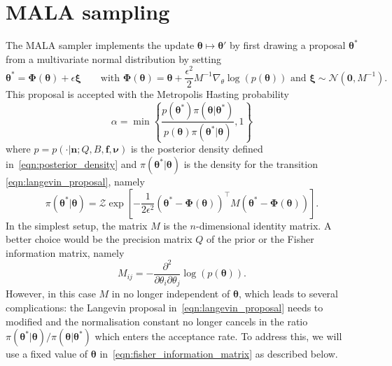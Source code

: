 \documentclass[11pt]{article}
\renewcommand{\vec}[1]{\boldsymbol{#1}}
\begin{document}
\section{MALA sampling}
The MALA sampler \cite{roberts1996exponential} implements the update $\vec{\theta}\mapsto\vec{\theta}'$ by first drawing a proposal $\vec{\theta}^*$ from a multivariate normal distribution by setting
\begin{equation}
\vec{\theta}^*=\vec{\Phi}(\vec{\theta})+\epsilon \vec{\xi} \qquad\text{with $\vec{\Phi}(\vec{\theta})=\vec{\theta}+\frac{\epsilon^2}{2}M^{-1}\nabla_\theta \log(p(\vec{\theta}))$ and $\vec{\xi}\sim \mathcal{N}(\vec{0},M^{-1})$}.
\label{eqn:langevin_proposal}
\end{equation}
This proposal is accepted with the Metropolis Hasting \cite{metropolis1953equation,hastings1970monte} probability
\begin{equation}
\alpha = \min\left\{\frac{p(\vec{\theta}^*)\pi(\vec{\theta}|\vec{\theta}^*)}{p(\vec{\theta})\pi(\vec{\theta}^*|\vec{\theta})},1\right\}
\end{equation}
where $p = p(\cdot|\vec{n};Q,B,\vec{f},\vec{\nu})$ is the posterior density defined in~\eqref{eqn:posterior_density} and $\pi(\vec{\theta}^*|\vec{\theta})$ is the density for the transition \eqref{eqn:langevin_proposal}, namely
\begin{equation}
    \pi(\vec{\theta}^*|\vec{\theta}) = \mathcal{Z}\exp\left[-\frac{1}{2\epsilon^2}(\vec{\theta}^*-\vec{\Phi}(\vec{\theta}))^\top M (\vec{\theta}^*-\vec{\Phi}(\vec{\theta}))\right].
\end{equation}
In the simplest setup, the matrix $M$ is the $n$-dimensional identity matrix. A better choice would be the precision matrix $Q$ of the prior or the Fisher information matrix, namely
\begin{equation}
M_{ij} = - \frac{\partial^2 }{\partial \theta_i \partial \theta_j} \log(p(\vec{\theta})).\label{eqn:fisher_information_matrix}
\end{equation}
However, in this case $M$ in no longer independent of $\vec{\theta}$, which leads to several complications: the Langevin proposal in~\eqref{eqn:langevin_proposal} needs to modified and the normalisation constant no longer cancels in the ratio $\pi(\vec{\theta}^*|\vec{\theta})/\pi(\vec{\theta}|\vec{\theta}^*)$ which enters the acceptance rate. To address this, we will use a fixed value of $\vec{\theta}$ in~\eqref{eqn:fisher_information_matrix} as described below.
\end{document}
